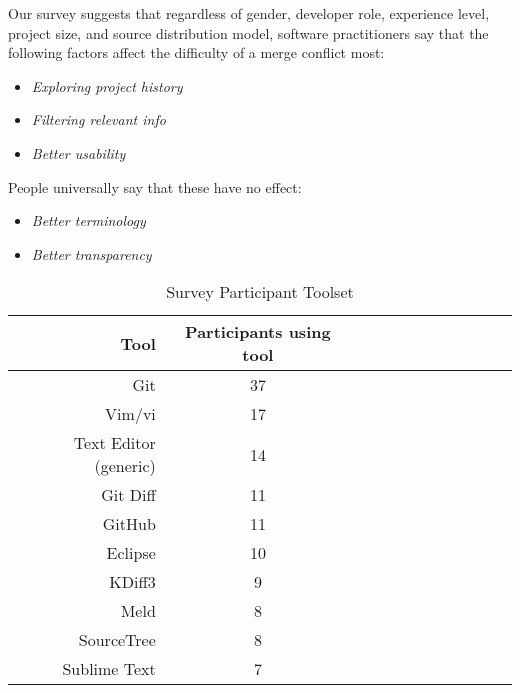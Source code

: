Our survey suggests that regardless of gender, developer role, experience level, project size, and source distribution model, software practitioners say that the following factors affect the difficulty of a merge conflict most:

\begin{itemize}
	\item \textit{Exploring project history}\\
	\item \textit{Filtering relevant info}\\
	\item \textit{Better usability}\\
\end{itemize}

People universally say that these have no effect:
\begin{itemize}
	\item \textit{Better terminology}\\
	\item \textit{Better transparency}\\
\end{itemize}

\begin{table}[!]
\renewcommand{\arraystretch}{1.3}
\caption{Survey Participant Toolset}
\label{survey_toolset}
\centering
\begin{tabularx}{0.45\textwidth}{@{}r|*{10}{C}c@{}}
\toprule
Tool & Participants using tool\\
\midrule
Git	& 37\\
Vim/vi & 17\\
Text Editor (generic) & 14\\
Git Diff & 11\\
GitHub & 11\\
Eclipse & 10\\
KDiff3 & 9\\
Meld & 8\\
SourceTree & 8\\
Sublime Text & 7\\
\bottomrule
\end{tabularx}
\end{table}